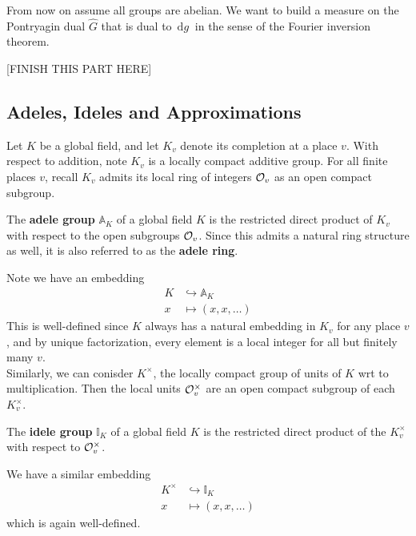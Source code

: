 \documentclass[11pt, x11names]{article}
\renewcommand{\aa}{\mathbb{A}}
\newcommand{\ii}{\mathbb{I}}
\newcommand{\inj}{\hookrightarrow}
\renewcommand{\hat}{\widehat}
\newcommand{\dg}{\, \mathrm{d}g \ }
\begin{document}
From now on assume all groups are abelian. We want to build a measure on the Pontryagin dual $\hat{G}$ that is dual to $\dg$ in the sense of the Fourier inversion theorem.

[FINISH THIS PART HERE]


\subsection{Adeles, Ideles and Approximations}
\label{subsection: Approximation theorem Adeles}

Let $K$ be a global field, and let $K_v$ denote its completion at a place $v$. With respect to addition, note $K_v$ is a locally compact additive group. For all finite places $v$, recall $K_v$ admits its local ring of integers $\mathcal{O}_v$ as an open compact subgroup.

\begin{defn}
    The \textbf{adele group} $\aa_K$ of a global field $K$ is the restricted direct product of $K_v$ with respect to the open subgroups $\mathcal{O}_v$. Since this admits a natural ring structure as well, it is also referred to as the \textbf{adele ring}.
\end{defn}

Note we have an embedding
\begin{equation*}
\begin{split}
    K & \inj \aa_K\\
    x &\mapsto (x, x, \ldots)
\end{split}
\end{equation*}
This is well-defined since $K$ always has a natural embedding in $K_v$ for any place $v$, and by unique factorization, every element is a local integer for all but finitely many $v$.\\

Similarly, we can conisder $K^\times$, the locally compact group of units of $K$ wrt to multiplication. Then the local units $\mathcal{O}_v^\times$ are an open compact subgroup of each $K_v^\times$.
\begin{defn}
The \textbf{idele group} $\ii_K$ of a global field $K$ is the restricted direct product of the $K_v^\times$ with respect to $\mathcal{O}_v^\times$.
\end{defn}

We have a similar embedding
\begin{equation*}
    \begin{split}
    K^\times &\inj \ii_K\\
    x &\mapsto (x, x, \ldots)
    \end{split}
\end{equation*}
which is again well-defined.
\end{document}
